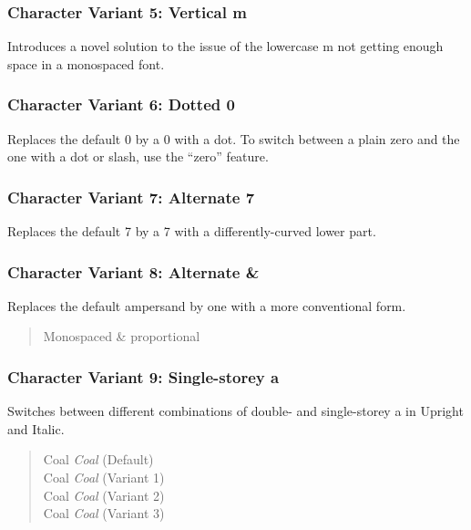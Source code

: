 \subsubsection{Character Variant 5: Vertical m}
Introduces a novel solution to the issue of the lowercase m not getting enough space in a monospaced font.
\begin{quote}
{ \sample}
\end{quote}

\subsubsection{Character Variant 6: Dotted 0}
Replaces the default 0 by a 0 with a dot. To switch between a plain zero and the one with a dot or slash, use the “zero” feature.
\begin{quote}
{ \sample}
\end{quote}

\subsubsection{Character Variant 7: Alternate 7}
Replaces the default 7 by a 7 with a differently-curved lower part.
\begin{quote}
{ \sample}
\end{quote}

\subsubsection{Character Variant 8: Alternate \&}
Replaces the default ampersand by one with a more conventional form.
\begin{quote}
{ Monospaced \& proportional}
\end{quote}

\subsubsection{Character Variant 9: Single-storey a}
Switches between different combinations of double- and single-storey a in Upright and Italic.
\begin{quote}
Coal \emph{Coal} (Default)\\
{ Coal \emph{Coal} (Variant 1)}\\
{ Coal \emph{Coal} (Variant 2)}\\
{ Coal \emph{Coal} (Variant 3)}
\end{quote}

